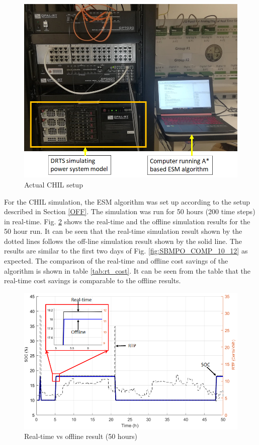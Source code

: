 \begin{figure}[!ht]
    \centering
    \includegraphics[width = \linewidth]{figs/A8/LAB_REAL.png}
    \caption{Actual CHIL setup}
    \label{fig:LAB_REAL}
\end{figure}

For the CHIL simulation, the ESM algorithm was set up according to the setup described in Section \ref{OFF}. The simulation was run for 50 hours (200 time steps) in real-time. Fig. \ref{fig:RT_TESTING} shows the real-time and the offline simulation results for the 50 hour run. It can be seen that the real-time simulation result shown by the dotted lines follows the off-line simulation result shown by the solid line. The results are similar to the first two days of Fig. \ref{fig:SBMPO_COMP_10_12} as expected. The comparison of the real-time and offline cost savings of the algorithm is shown in table \ref{tab:rt_cost}. It can be seen from the table that the real-time cost savings is comparable to the offline results.

\begin{figure}[!ht]
    \centering
    \includegraphics[width = \linewidth]{figs/A8/RT_TESTING.png}
    \caption{Real-time vs offline result (50  hours)}
    \label{fig:RT_TESTING}
\end{figure}

